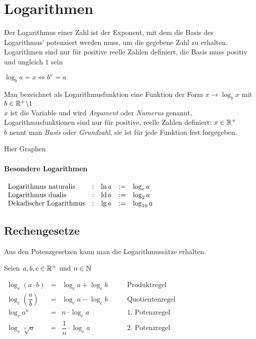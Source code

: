 \documentclass[../MAIN/main.tex]{subfiles}
\begin{document}
\chapter{Logarithmen}

\begin{Definition}
Der Logarithmus einer Zahl ist der Exponent, mit dem die Basis des Logarithmus' potenziert werden muss, um die gegebene Zahl zu erhalten. Logarithmen sind nur für positive reelle Zahlen definiert, die Basis muss positiv und ungleich $1$  sein
\begin{center}
$\log_ba=x\Leftrightarrow b^x=a$
\end{center}
\end{Definition}

\begin{Definition}
Man bezeichnet als Logarithmusfunktion eine Funktion der Form $x\rightarrow \log_bx$ mit $b\in \mathbb{R}^+\backslash 1$\\
$x$ ist die Variable und wird \textit{Argument} oder \textit{Numerus} genannt, Logarithmusfunktionen sind nur für positive, reelle Zahlen definiert: $x\in\mathbb{R}^+$\\
$b$ nennt man \textit{Basis} oder \textit{Grundzahl}, sie ist für jede Funktion fest forgegeben.\\
\end{Definition}

Hier Graphen
\subsubsection{Besondere Logarithmen}

$\begin{array}{lcccl}
\mbox{Logarithmus naturalis}&:&\ln a&:=&\log_ea\\
\mbox{Logarithmus dualis}&:&\operatorname{ld} a&:=&\log_2a\\
\mbox{Dekadischer Logarithmus}&:&\lg a&:=&\log_{10}a
\end{array}$
\\
	
			\section{Rechengesetze}

Aus den Potenzgesetzen kann man die Logarithmussätze erhalten.

\begin{Theorem}
Seien $a,b,c\in\mathbb{R}^+$ und $n\in\mathbb{N}$\\
\begin{center}
$\begin{array}{cccl}
\log_c(a\cdot b)&=&\log_ca+\log_cb&\qquad\mbox {Produktregel}\\
\log_c\left(\dfrac{a}{b}\right)&=&\log_ca-\log_cb&\qquad\mbox{Quotientenregel}\\
\log_ca^n&=&n\cdot\log_ca&\qquad\mbox{1. Potenzregel}\\
\log_c\sqrt[n]{a}&=&\dfrac{1}{n}\cdot\log_ca&\qquad\mbox{2. Potenzregel}\\
\end{array}$
\end{center}
\end{Theorem}
\end{document}
